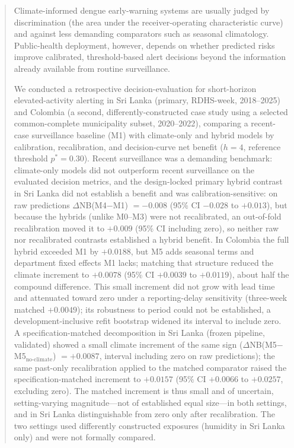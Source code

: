 \documentclass[11pt,a4paper]{article}
\begin{document}
\begin{abstract}
\noindent Climate-informed dengue early-warning systems are usually judged by discrimination (the area under the receiver-operating characteristic curve) and against less demanding comparators such as seasonal climatology. Public-health deployment, however, depends on whether predicted risks improve calibrated, threshold-based alert decisions beyond the information already available from routine surveillance.

\noindent We conducted a retrospective decision-evaluation for short-horizon elevated-activity alerting in Sri Lanka (primary, RDHS-week, 2018--2025) and Colombia (a second, differently-constructed case study using a selected common-complete municipality subset, 2020--2022), comparing a recent-case surveillance baseline (M1) with climate-only and hybrid models by calibration, recalibration, and decision-curve net benefit ($h=4$, reference threshold $p^*=0.30$). Recent surveillance was a demanding benchmark: climate-only models did not outperform recent surveillance on the evaluated decision metrics, and the design-locked primary hybrid contrast in Sri Lanka did not establish a benefit and was calibration-sensitive: on raw predictions $\Delta$NB(M4$-$M1) $=-0.008$ (95\% CI $-0.028$ to $+0.013$), but because the hybrids (unlike M0--M3) were not recalibrated, an out-of-fold recalibration moved it to $+0.009$ (95\% CI including zero), so neither raw nor recalibrated contrasts established a hybrid benefit. In Colombia the full hybrid exceeded M1 by $+0.0188$, but M5 adds seasonal terms and department fixed effects M1 lacks; matching that structure reduced the climate increment to $+0.0078$ (95\% CI $+0.0039$ to $+0.0119$), about half the compound difference. This small increment did not grow with lead time and attenuated toward zero under a reporting-delay sensitivity (three-week matched $+0.0049$); its robustness to period could not be established, a development-inclusive refit bootstrap widened its interval to include zero. A specification-matched decomposition in Sri Lanka (frozen pipeline, validated) showed a small climate increment of the same sign ($\Delta$NB(M5$-$M5$_{\text{no-climate}}$) $=+0.0087$, interval including zero on raw predictions); the same past-only recalibration applied to the matched comparator raised the specification-matched increment to $+0.0157$ (95\% CI $+0.0066$ to $+0.0257$, excluding zero). The matched increment is thus small and of uncertain, setting-varying magnitude---not of established equal size---in both settings, and in Sri Lanka distinguishable from zero only after recalibration. The two settings used differently constructed exposures (humidity in Sri Lanka only) and were not formally compared.


\end{abstract}
\end{document}
